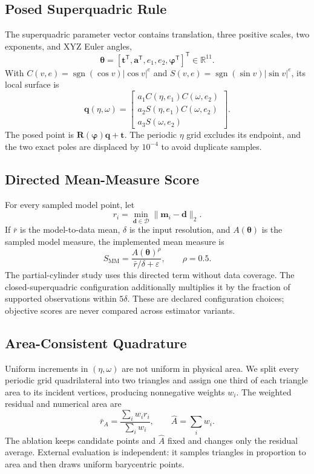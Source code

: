 \documentclass[conference]{IEEEtran}
\newcommand{\R}{\mathbb{R}}
\begin{document}
\subsection{Posed Superquadric Rule}
The superquadric parameter vector contains translation, three positive scales,
two exponents, and XYZ Euler angles,
\begin{equation}
\boldsymbol\theta=[\mathbf t^{\mathsf T},\mathbf a^{\mathsf T},e_1,e_2,
\boldsymbol\varphi^{\mathsf T}]^{\mathsf T}\in\R^{11}.
\end{equation}
With $C(v,e)=\operatorname{sgn}(\cos v)|\cos v|^e$ and
$S(v,e)=\operatorname{sgn}(\sin v)|\sin v|^e$, its local surface is
\begin{equation}
\mathbf q(\eta,\omega)=
\begin{bmatrix}
a_1C(\eta,e_1)C(\omega,e_2)\\
a_2S(\eta,e_1)C(\omega,e_2)\\
a_3S(\omega,e_2)
\end{bmatrix}.
\end{equation}
The posed point is $\mathbf R(\boldsymbol\varphi)\mathbf q+\mathbf t$.
The periodic $\eta$ grid excludes its endpoint, and the two exact poles are
displaced by $10^{-4}$ to avoid duplicate samples.

\subsection{Directed Mean-Measure Score}
For every sampled model point, let
\begin{equation}
r_i=\min_{\mathbf d\in\mathcal D}\|\mathbf m_i-\mathbf d\|_2.
\end{equation}
If $\bar r$ is the model-to-data mean, $\delta$ is the input resolution, and
$A(\boldsymbol\theta)$ is the sampled model measure, the implemented mean
measure is
\begin{equation}
S_{\mathrm{MM}}=\frac{A(\boldsymbol\theta)^{\rho}}
{\bar r/\delta+\varepsilon},\qquad \rho=0.5.
\label{eq:mm}
\end{equation}
The partial-cylinder study uses this directed term without data coverage.  The
closed-superquadric configuration additionally multiplies it by the fraction of
supported observations within $5\delta$.  These are declared configuration
choices; objective scores are never compared across estimator variants.

\subsection{Area-Consistent Quadrature}
Uniform increments in $(\eta,\omega)$ are not uniform in physical area.  We
split every periodic grid quadrilateral into two triangles and assign one third
of each triangle area to its incident vertices, producing nonnegative weights
$w_i$.  The weighted residual and numerical area are
\begin{equation}
\bar r_A=\frac{\sum_i w_i r_i}{\sum_i w_i},\qquad
\widehat A=\sum_i w_i.
\end{equation}
The ablation keeps candidate points and $\widehat A$ fixed and changes only the
residual average.  External evaluation is independent: it samples triangles in
proportion to area and then draws uniform barycentric points.
\end{document}
